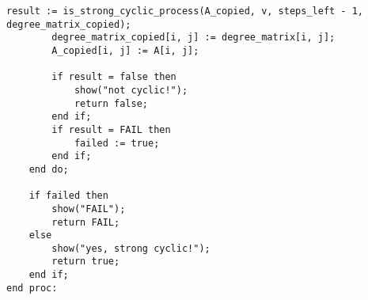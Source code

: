 \begin{lstlisting}[basicstyle=\scriptsize]
        result := is_strong_cyclic_process(A_copied, v, steps_left - 1, degree_matrix_copied);
        degree_matrix_copied[i, j] := degree_matrix[i, j];
        A_copied[i, j] := A[i, j];
        
        if result = false then
            show("not cyclic!");
            return false;
        end if;
        if result = FAIL then
            failed := true;
        end if;
    end do;
    
    if failed then
        show("FAIL");
        return FAIL;
    else
        show("yes, strong cyclic!");
        return true;
    end if;
end proc:

\end{lstlisting}
